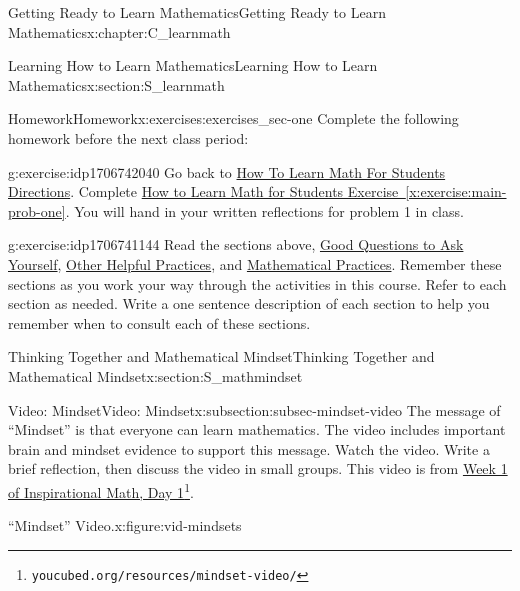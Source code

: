 \documentclass[oneside,10pt,]{book}
\newcommand{\xreffont}{\relax}
\numberwithin{equation}{chapter}
\newlength{\qrsize}
\newlength{\previewwidth}
\begin{document}
\begin{chapterptx}{Getting Ready to Learn Mathematics}{}{Getting Ready to Learn Mathematics}{}{}{x:chapter:C_learnmath}
\begin{sectionptx}{Learning How to Learn Mathematics}{}{Learning How to Learn Mathematics}{}{}{x:section:S_learnmath}
\begin{exercises-subsection}{Homework}{}{Homework}{}{}{x:exercises:exercises_sec-one}
Complete the following homework before the next class period:%
\begin{divisionexercise}{1}{}{}{g:exercise:idp1706742040}%
Go back to \hyperlink{x:paragraphs:htlmfs-directions}{How To Learn Math For Students Directions}. Complete \hyperref[x:exercise:main-prob-one]{How to Learn Math for Students Exercise~{\xreffont\ref{x:exercise:main-prob-one}}}. You will hand in your written reflections for problem 1 in class.%
\end{divisionexercise}%
\begin{divisionexercise}{2}{}{}{g:exercise:idp1706741144}%
Read the sections above, \hyperref[x:subsection:subsec-good-questions]{Good Questions to Ask Yourself}, \hyperref[x:subsection:subsec-practices]{Other Helpful Practices}, and \hyperref[x:subsection:subsec-math-practices]{Mathematical Practices}. Remember these sections as you work your way through the activities in this course. Refer to each section as needed. Write a one sentence description of each section to help you remember when to consult each of these sections.%
\end{divisionexercise}%
\end{exercises-subsection}
\end{sectionptx}
%
%
\typeout{************************************************}
\typeout{************************************************}
%
\begin{sectionptx}{Thinking Together and Mathematical Mindset}{}{Thinking Together and Mathematical Mindset}{}{}{x:section:S_mathmindset}
%
%
\typeout{************************************************}
\typeout{************************************************}
%
\begin{subsectionptx}{Video: Mindset}{}{Video: Mindset}{}{}{x:subsection:subsec-mindset-video}
The message of ``Mindset'' is that everyone can learn mathematics. The video includes important brain and mindset evidence to support this message. Watch the video. Write a brief reflection, then discuss the video in small groups. This video is from \href{https://www.youcubed.org/resources/mindset-video/}{Week 1 of Inspirational Math, Day 1}\footnote{\nolinkurl{youcubed.org/resources/mindset-video/}\label{g:fn:idp1706739608}}.%
\begin{figureptx}{``Mindset'' Video.}{x:figure:vid-mindsets}{}%
\centering
\setlength{\qrsize}{9em}
\setlength{\previewwidth}{\linewidth}
\addtolength{\previewwidth}{-\qrsize}
\begin{tcbraster}[raster columns=2, raster column skip=1pt, raster halign=center, raster force size=false, raster left skip=0pt, raster right skip=0pt]%

\end{tcbraster}
\end{figureptx}
\end{subsectionptx}
\end{sectionptx}
\end{chapterptx}
\end{document}

